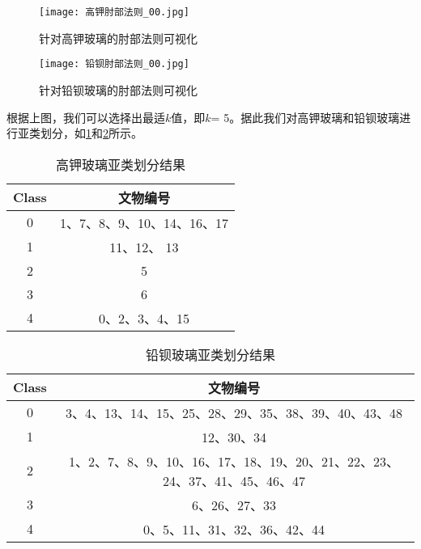 \documentclass{MathModeling}
\begin{document}
		\begin{figure}[htbp]
			\begin{minipage}[t]{0.5\textwidth}%
			\centering
			\texttt{[image: 高钾肘部法则\_00.jpg]}
			\caption{针对高钾玻璃的肘部法则可视化}%
			\label{高钾肘部法则}
			\end{minipage}
			\begin{minipage}[t]{0.5\textwidth}
			\centering
			\texttt{[image: 铅钡肘部法则\_00.jpg]}
			\caption{针对铅钡玻璃的肘部法则可视化}
			\label{铅钡肘部法则}
			\end{minipage}
		\end{figure}
	
		根据上图，我们可以选择出最适$k$值，即$k$= 5。据此我们对高钾玻璃和铅钡玻璃进行亚类划分，如\textcolor{blue}{\cref{高钾亚类}}和\textcolor{blue}{\cref{铅钡亚类}}所示。
		
\begin{table}[htbp]
	\centering
	\caption{高钾玻璃亚类划分结果}
	  \begin{tabular}{ccccc}
	  \toprule
	  \textbf{Class} & \multicolumn{4}{c}{\textbf{文物编号}} \\
	  \midrule
	  0     & \multicolumn{4}{c}{1、7、8、9、10、14、16、17} \\
	  1     & \multicolumn{4}{c}{11、12、 13} \\
	  2     & \multicolumn{4}{c}{5} \\
	  3     & \multicolumn{4}{c}{6} \\
	  4     & \multicolumn{4}{c}{0、2、3、4、15} \\
	  \bottomrule
	  \end{tabular}%
	\label{高钾亚类}%
  \end{table}%
  \begin{table}[htbp]
	\centering
	\caption{铅钡玻璃亚类划分结果}
	  \begin{tabular}{cccccccccc}
	  \toprule
	  \textbf{Class} & \multicolumn{9}{c}{\textbf{文物编号}} \\
	  \midrule
	  0     & \multicolumn{9}{c}{3、4、13、14、15、25、28、29、35、38、39、40、43、48} \\
	  1     & \multicolumn{9}{c}{12、30、34} \\
	  2     & \multicolumn{9}{c}{1、2、7、8、9、10、16、17、18、19、20、21、22、23、24、37、41、45、46、47} \\
	  3     & \multicolumn{9}{c}{6、26、27、33} \\
	  4     & \multicolumn{9}{c}{0、5、11、31、32、36、42、44} \\
	  \bottomrule
	  \end{tabular}%
	\label{铅钡亚类}%
  \end{table}%
\end{document}
